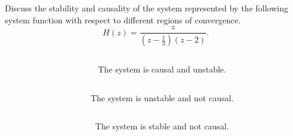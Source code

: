 \begin{frame}{}
    \begin{example}
        Discuss the stability and causality of the system represented by the following system function with respect to different regions of convergence.
        \begin{equation*}
            H(z) = \frac{z}{\left(z-\frac{1}{3}\right)(z-2)}.
        \end{equation*}
    \end{example}
\end{frame}

\begin{frame}{}
    \begin{columns}
        \begin{column}{3in}
            \begin{center}
                
            \end{center}
        \end{column}
        \begin{column}{2in}
            \pause
            The system is causal and unstable.
        \end{column}
    \end{columns}
\end{frame}



\begin{frame}{}
    \begin{columns}
        \begin{column}{3in}
            \begin{center}
                
            \end{center}
        \end{column}
        \begin{column}{2in}
            \pause
            The system is unstable and not causal.
        \end{column}
    \end{columns}
\end{frame}

\begin{frame}{}
    \begin{columns}
        \begin{column}{3in}
            \begin{center}
                
            \end{center}
        \end{column}
        \begin{column}{2in}
            \pause
                The system is stable and not causal.
        \end{column}
    \end{columns}
\end{frame}





